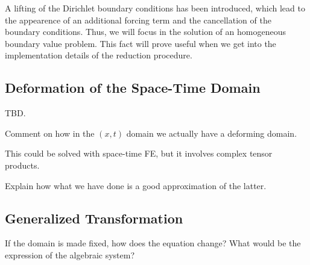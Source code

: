\documentclass[../../main.tex]{subfiles}
\begin{document}
A lifting of the Dirichlet boundary conditions has been introduced, which lead to the appearence of an additional forcing term and the cancellation of the boundary conditions.
Thus, we will focus in the solution of an homogeneous boundary value problem.
This fact will prove useful when we get into the implementation details of the reduction procedure.

\subsection{Deformation of the Space-Time Domain}
TBD.

Comment on how in the $(x,t)$ domain we actually have a deforming domain. 

This could be solved with space-time FE, but it involves complex tensor products. 

Explain how what we have done is a good approximation of the latter.

\subsection{Generalized Transformation}
If the domain is made fixed, 
how does the equation change?
What would be the expression of the algebraic system?
\end{document}
